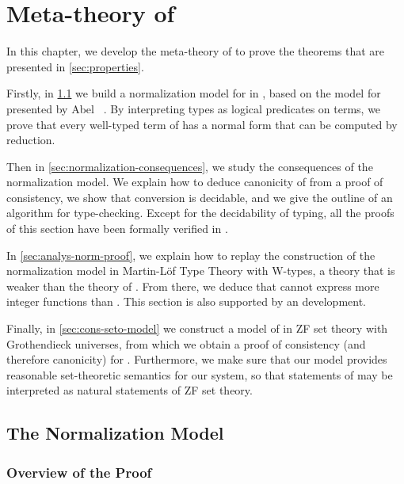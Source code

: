 \setchapterpreamble[u]{\margintoc}
\chapter{Meta-theory of \SetoidCC}

In this chapter, we develop the meta-theory of \SetoidCC to prove
the theorems that are presented in \cref{sec:properties}.

Firstly, in \cref{sec:logic-relat-with} we build a normalization model for \SetoidCC
in \Agda, based on the model for \MLTT presented by Abel 
\etal~\cite{Abel:POPL2018}. 
% 
By interpreting types as logical predicates on terms, we prove that 
every well-typed term of \SetoidCC has a normal form that can be computed
by reduction.

Then in \cref{sec:normalization-consequences}, we study the consequences of 
the normalization model. We explain how to deduce canonicity of \SetoidCC from
a proof of consistency, we show that conversion is decidable, and we give the 
outline of an algorithm for type-checking. 
% 
Except for the decidability of typing, all the proofs of this section have been
formally verified in \Agda. 

In \cref{sec:analys-norm-proof}, we explain how to replay the construction of
the normalization model in Martin-Löf Type Theory with W-types, a theory that is
weaker than the theory of \Agda. 
% 
From there, we deduce that \SetoidCC cannot express more integer functions than \MLTT. 
% 
This section is also supported by an \Agda development.

Finally, in \cref{sec:cons-seto-model} we construct a model of \SetoidCC in ZF 
set theory with Grothendieck universes, from which we obtain a proof of 
consistency (and therefore canonicity) for \SetoidCC. Furthermore, we make sure
that our model provides reasonable set-theoretic semantics for our system, so
that statements of \SetoidCC may be interpreted as natural statements of ZF set 
theory.

\section{The Normalization Model}
\label{sec:logic-relat-with}

\subsection{Overview of the Proof}

